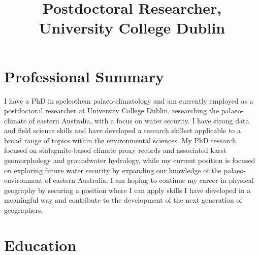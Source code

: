 \documentclass[11pt,a4paper,]{moderncv}
\title{Postdoctoral Researcher, University College Dublin}
\begin{document}
\makecvtitle



\hypertarget{professional-summary}{%
\section{Professional Summary}\label{professional-summary}}

I have a PhD in speleothem palaeo-climatology and am currently employed
as a postdoctoral researcher at University College Dublin, researching
the palaeo-climate of eastern Australia, with a focus on water security.
I have strong data and field science skills and have developed a
research skillset applicable to a broad range of topics within the
environmental sciences. My PhD research focused on stalagmite-based
climate proxy records and associated karst geomorphology and groundwater
hydrology, while my current position is focused on exploring future
water security by expanding our knowledge of the palaeo-environment of
eastern Australia. I am hoping to continue my career in physical
geography by securing a position where I can apply skills I have
developed in a meaningful way and contribute to the development of the
next generation of geographers.

\hypertarget{education}{%
\section{Education}\label{education}}

\nopagebreak
    \nopagebreak
\end{document}
